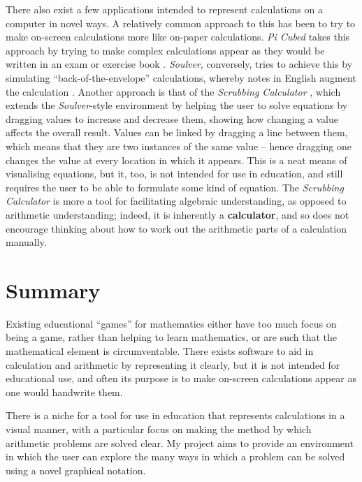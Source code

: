 \documentclass[12pt,twoside,notitlepage,xetex]{report}
\begin{document}
There also exist a few applications intended to represent calculations on a
computer in novel ways.  A relatively common approach to this has been to try
to make on-screen calculations more like on-paper calculations.  \emph{Pi Cubed}
takes this approach by trying to make complex calculations appear as they would
be written in an exam or exercise book \cite{PiCubed}.  \emph{Soulver},
conversely, tries to achieve this by simulating ``back-of-the-envelope''
calculations, whereby notes in English augment the calculation \cite{Soulver}.
Another approach is that of the \emph{Scrubbing Calculator} \cite{ScrubCalc},
which extends the \emph{Soulver}-style environment by helping the user to solve
equations by dragging values to increase and decrease them, showing how changing
a value affects the overall result.  Values can be linked by dragging a line
between them, which means that they are two instances of the same value -- hence
dragging one changes the value at every location in which it appears.  This is a
neat means of visualising equations, but it, too, is not intended for use in
education, and still requires the user to be able to formulate some kind of
equation.  The \emph{Scrubbing Calculator} is more a tool for facilitating
algebraic understanding, as opposed to arithmetic understanding; indeed, it is
inherently a {\bf calculator}, and so does not encourage thinking about how to
work out the arithmetic parts of a calculation manually.

\section{Summary}

Existing educational ``games'' for mathematics either have too much focus on
being a game, rather than helping to learn mathematics, or are such that the
mathematical element is circumventable.  There exists software to aid in
calculation and arithmetic by representing it clearly, but it is not intended
for educational use, and often its purpose is to make on-screen calculations
appear as one would handwrite them.

There is a niche for a tool for use in education that represents calculations in
a visual manner, with a particular focus on making the method by which arithmetic
problems are solved clear.  My project aims to provide an environment in which
the user can explore the many ways in which a problem can be solved using a
novel graphical notation.
\end{document}
